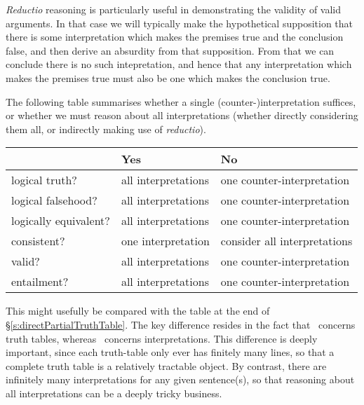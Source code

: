 \begin{earg}
\emph{Reductio} reasoning is particularly useful in demonstrating the validity of valid arguments. In that case we will typically make the hypothetical supposition that there is some interpretation which makes the premises true and the conclusion false, and then derive an absurdity from that supposition. From that we can conclude there is no such intepretation, and hence that any interpretation which makes the premises true must also be one which makes the conclusion true. 

The following table summarises whether a single (counter-)interpretation suffices, or whether we must reason about all interpretations (whether directly considering them all, or indirectly making use of \emph{reductio}).


\begin{center}
\begin{tabular}{l l l} \toprule 
 & \textbf{Yes} & \textbf{No}\\
 \midrule
logical truth? & all interpretations & one counter-interpretation\\
logical falsehood? &  all interpretations  & one counter-interpretation\\
logically equivalent? & all interpretations & one counter-interpretation\\
consistent? & one interpretation & consider all interpretations\\
valid? & all interpretations & one counter-interpretation\\
entailment? & all interpretations & one counter-interpretation\\
\bottomrule \end{tabular}
\end{center}
\label{table.ModelOrArgument}
This might usefully be compared with the table at the end of §\ref{s:directPartialTruthTable}. The key difference resides in the fact that \TFL\ concerns truth tables, whereas \FOL\ concerns interpretations. This difference is deeply important, since each truth-table only ever has finitely many lines, so that a complete truth table is a relatively tractable object. By contrast, there are infinitely many interpretations for any given sentence(s), so that reasoning about all interpretations can be a deeply tricky business. 



\end{earg}
